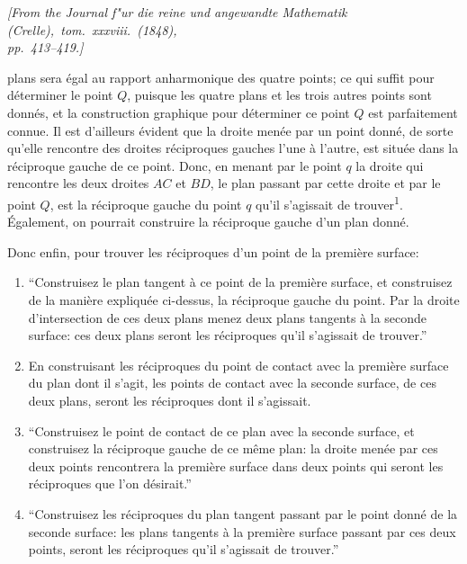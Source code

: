 \documentclass[11pt,a4paper]{book}
\begin{document}
\begin{flushright}
\textit{[From the Journal f"{u}r die reine und angewandte Mathematik (Crelle),\ tom.\ xxxviii.\ (1848),\\
pp.\ 413--419.]}
\end{flushright}

\setcounter{page}{417}

plans sera \'{e}gal au rapport anharmonique des quatre points; ce qui suffit pour d\'{e}terminer le point $Q$, puisque les quatre plans et les trois autres points sont donn\'{e}s, et la construction graphique pour d\'{e}terminer ce point $Q$ est parfaitement connue. Il est d'ailleurs \'{e}vident que la droite men\'{e}e par un point donn\'{e}, de sorte qu'elle rencontre des droites r\'{e}ciproques gauches l'une \`{a} l'autre, est situ\'{e}e dans la r\'{e}ciproque gauche de ce point. Donc, en menant par le point $q$ la droite qui rencontre les deux droites $AC$ et $BD$, le plan passant par cette droite et par le point $Q$, est la r\'{e}ciproque gauche du point $q$ qu'il s'agissait de trouver\textsuperscript{1}. \'{E}galement, on pourrait construire la r\'{e}ciproque gauche d'un plan donn\'{e}.

Donc enfin, pour trouver les r\'{e}ciproques d'un point de la premi\`{e}re surface:

\begin{enumerate}[label=(\Alph*)]
\item ``Construisez le plan tangent \`{a} ce point de la premi\`{e}re surface, et construisez de la mani\`{e}re expliqu\'{e}e ci-dessus, la r\'{e}ciproque gauche du point. Par la droite d'intersection de ces deux plans menez deux plans tangents \`{a} la seconde surface: ces deux plans seront les r\'{e}ciproques qu'il s'agissait de trouver.''

\item En construisant les r\'{e}ciproques du point de contact avec la premi\`{e}re surface du plan dont il s'agit, les points de contact avec la seconde surface, de ces deux plans, seront les r\'{e}ciproques dont il s'agissait.

\item ``Construisez le point de contact de ce plan avec la seconde surface, et construisez la r\'{e}ciproque gauche de ce m\^{e}me plan: la droite men\'{e}e par ces deux points rencontrera la premi\`{e}re surface dans deux points qui seront les r\'{e}ciproques que l'on d\'{e}sirait.''

\item ``Construisez les r\'{e}ciproques du plan tangent passant par le point donn\'{e} de la seconde surface: les plans tangents \`{a} la premi\`{e}re surface passant par ces deux points, seront les r\'{e}ciproques qu'il s'agissait de trouver.''
\end{enumerate}
\end{document}
